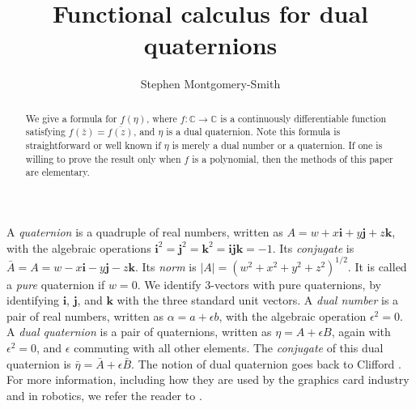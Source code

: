 \documentclass[12pt,reqno]{amsart}
\newcommand\bi{\bm i}
\newcommand\bj{\bm j}
\newcommand\bk{\bm k}
\begin{document}
\title{Functional calculus for dual quaternions}
\author{Stephen Montgomery-Smith}
\address{Department of Mathematics, University of Missouri, Columbia, MO 65211, USA\\
\rm\url{stephen@missouri.edu}\\
\rm\url{https://stephenmontgomerysmith.github.io}\\
}

\begin{abstract}  We give a formula for $f(\eta)$, where $f :\mathbb C \to \mathbb C$ is a continuously differentiable function satisfying
$f(\bar z) = \overline{f(z)}$,
and $\eta$ is a dual quaternion.  Note this formula is straightforward or well known if $\eta$ is merely a dual number or a quaternion.  If one is willing to prove the result only when $f$ is a polynomial, then the methods of this paper are elementary.
\end{abstract}



\maketitle

A \emph{quaternion} is a quadruple of real numbers, written as $A = w + x \bi + y \bj + z \bk$, with the algebraic operations $\bi^2 = \bj^2 = \bk^2 = \bi \bj \bk = -1$.  Its \emph{conjugate} is $\bar A = A = w - x \bi - y \bj - z \bk$.  Its \emph{norm} is $|A| = (w^2+x^2+y^2+z^2)^{1/2}$.  It is called a \emph{pure} quaternion if $w = 0$.  We identify 3-vectors with pure quaternions, by identifying $\bi$, $\bj$, and $\bk$ with the three standard unit vectors.  A \emph{dual number} is a pair of real numbers, written as $\alpha = a + \epsilon b$, with the algebraic operation $\epsilon^2 = 0$.  A \emph{dual quaternion} is a pair of quaternions, written as $\eta = A + \epsilon B$, again with $\epsilon^2 = 0$, and $\epsilon$ commuting with all other elements.  The \emph{conjugate} of this dual quaternion is $\bar \eta = \bar A + \epsilon \bar B$.  The notion of dual quaternion goes back to Clifford \cite{clifford}.  For more information, including how they are used by the graphics card industry and in robotics, we refer the reader to \cite{adorno,agrawal,han-et-al,kavan-et-al,kavan-et-al-2,kenwright,kussaba-et-al,schilling1,schilling2,yang-et-al}.
\end{document}
